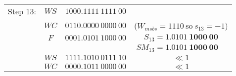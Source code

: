 \documentclass[12pt]{article}
\begin{document}
{\small
\begin{center}
\begin{tabular}{cccc}
    Step 13:&$WS    $&$1000.1111\ 1111\ 00$&\\
            &$WC    $&$0110.0000\ 0000\ 00$&($W_{msbs}=1110\ \text{so}\ s_{13}=-1$)\\
            &$F     $&$0001.0101\ 1000\ 00$&$S_{13}=\mathbf{1.0101\ 1000\ 00}$\\
            &        &                     &$SM_{13}=\mathbf{1.0101\ 1000\ 00}\phantom{M}$\\
    \cline{2-3}
            &$WS    $&$1111.1010\ 0111\ 10$&$\ll1$\\
            &$WC    $&$0000.1011\ 0000\ 00$&$\ll1$\\
\end{tabular}
\end{center}
}

\vfill
\eject
\end{document}
